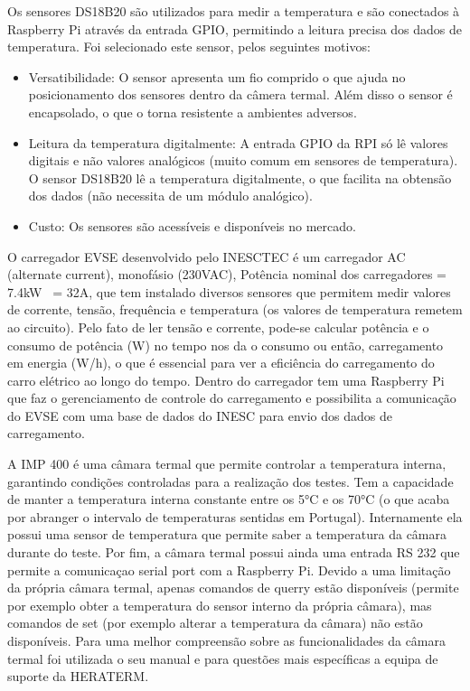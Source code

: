 Os sensores DS18B20 são utilizados para medir a temperatura e são conectados à Raspberry Pi através da entrada GPIO, permitindo a leitura precisa dos dados de temperatura. Foi selecionado este sensor, pelos seguintes motivos:
\begin{itemize}
    \item Versatibilidade: O sensor apresenta um fio comprido o que ajuda no posicionamento dos sensores dentro da câmera termal.
    Além disso o sensor é encapsolado, o que o torna resistente a ambientes adversos.
    \item Leitura da temperatura digitalmente: A entrada GPIO da RPI só lê valores digitais e não valores analógicos (muito comum em sensores de temperatura). O sensor DS18B20 lê a temperatura digitalmente, o que facilita na obtensão dos dados (não necessita de um módulo analógico).
    \item Custo: Os sensores são acessíveis e disponíveis no mercado.
\end{itemize}

O carregador EVSE desenvolvido pelo INESCTEC é um carregador AC (alternate current), 
monofásio (230VAC), Potência nominal dos carregadores = 7.4kW ~= 32A, que tem instalado
diversos sensores que permitem medir valores de corrente, tensão, frequência e temperatura 
(os valores de temperatura remetem ao circuito). Pelo fato de ler tensão e corrente, pode-se 
calcular potência e o consumo de potência (W) no tempo nos da o consumo ou então, carregamento em energia (W/h),
o que é essencial para ver a eficiência do carregamento do carro elétrico ao longo do tempo.
Dentro do carregador tem uma Raspberry Pi que faz o gerenciamento de controle do carregamento e 
possibilita a comunicação do EVSE com uma base de dados do INESC para envio dos dados de carregamento.


A IMP 400 é uma câmara termal que permite controlar a temperatura interna, garantindo condições controladas para a realização dos testes. 
Tem a capacidade de manter a temperatura interna constante entre os 5°C e os 70°C (o que acaba por 
abranger o intervalo de temperaturas sentidas em Portugal). Internamente ela possui uma sensor de temperatura
que permite saber a temperatura da câmara durante do teste. Por fim, a câmara termal possui ainda
uma entrada RS 232 que permite a comunicaçao serial port com a Raspberry Pi. Devido a uma limitação
da própria câmara termal, apenas comandos de querry estão disponíveis (permite por exemplo obter a temperatura
do sensor interno da própria câmara), mas comandos de set (por exemplo alterar a temperatura da câmara) não estão disponíveis.
Para uma melhor compreensão sobre as funcionalidades da câmara termal foi utilizada o seu manual \cite{chamber_manual} e para questões mais específicas a equipa de suporte da HERATERM.

